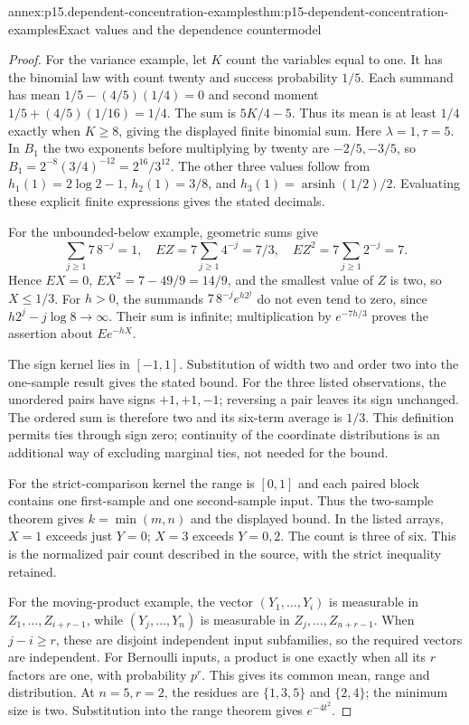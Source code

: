 \begin{annexitem}{annex:p15.dependent-concentration-examples}{thm:p15-dependent-concentration-examples}{Exact values and the dependence countermodel}
\begin{proof}
For the variance example, let \(K\) count the variables equal to one.
It has the binomial law with count twenty and success probability \(1/5\).
Each summand has mean \(1/5-(4/5)(1/4)=0\) and second moment
\(1/5+(4/5)(1/16)=1/4\). The sum is \(5K/4-5\).
Thus its mean is at least \(1/4\) exactly when \(K\geq8\), giving
the displayed finite binomial sum. Here \(\lambda=1,\tau=5\).
In \(B_1\) the two exponents before multiplying by twenty are
\(-2/5,-3/5\), so
\(B_1=2^{-8}(3/4)^{-12}=2^{16}/3^{12}\).
The other three values follow from
\(h_1(1)=2\log2-1\), \(h_2(1)=3/8\), and
\(h_3(1)=\operatorname{arsinh}(1/2)/2\).
Evaluating these explicit finite expressions gives the stated decimals.

For the unbounded-below example, geometric sums give
\[
 \sum_{j\geq1}7\,8^{-j}=1,\quad
 EZ=7\sum_{j\geq1}4^{-j}=7/3,\quad
 EZ^2=7\sum_{j\geq1}2^{-j}=7.
\]
Hence \(EX=0\), \(EX^2=7-49/9=14/9\), and the smallest value
of \(Z\) is two, so \(X\leq1/3\).
For \(h>0\), the summands \(7\,8^{-j}e^{h2^j}\) do not even tend
to zero, since \(h2^j-j\log8\to\infty\).
Their sum is infinite; multiplication by \(e^{-7h/3}\) proves the
assertion about \(Ee^{-hX}\).

The sign kernel lies in \([-1,1]\). Substitution of width two and
order two into the one-sample result gives the stated bound.
For the three listed observations, the unordered pairs have signs
\(+1,+1,-1\); reversing a pair leaves its sign unchanged.
The ordered sum is therefore two and its six-term average is \(1/3\).
This definition permits ties through sign zero; continuity of the
coordinate distributions is an additional way of excluding marginal
ties, not needed for the bound.

For the strict-comparison kernel the range is \([0,1]\) and each
paired block contains one first-sample and one second-sample input.
Thus the two-sample theorem gives \(k=\min(m,n)\) and the displayed
bound. In the listed arrays, \(X=1\) exceeds just \(Y=0\);
\(X=3\) exceeds \(Y=0,2\). The count is three of six.
This is the normalized pair count described in the source, with the
strict inequality retained.

For the moving-product example, the vector \((Y_1,\ldots,Y_i)\)
is measurable in \(Z_1,\ldots,Z_{i+r-1}\), while
\((Y_j,\ldots,Y_n)\) is measurable in
\(Z_j,\ldots,Z_{n+r-1}\).
When \(j-i\geq r\), these are disjoint independent input subfamilies,
so the required vectors are independent.
For Bernoulli inputs, a product is one exactly when all its \(r\)
factors are one, with probability \(p^r\). This gives its common
mean, range and distribution. At \(n=5,r=2\), the residues are
\(\{1,3,5\}\) and \(\{2,4\}\); the minimum size is two.
Substitution into the range theorem gives \(e^{-4t^2}\).


\end{proof}
\end{annexitem}
